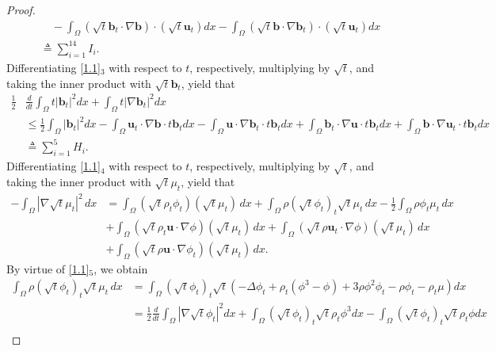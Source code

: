 \documentclass[11pt]{article}
\numberwithin{equation}{section}
\begin{document}
\begin{proof}
\begin{equation}
\begin{split}
&\quad-\int_\Omega\left(\sqrt t \mathbf{b}_t\cdot\nabla \mathbf{b} \right)\cdot \left(\sqrt t \mathbf{u}_t \right)dx
-\int_\Omega\left(\sqrt t \mathbf{b}\cdot\nabla \mathbf{b}_t\right)\cdot \left(\sqrt t \mathbf{u}_t\right)dx
\\&\triangleq\sum_{i=1}^{14} I_i .
\end{split}
\end{equation}
Differentiating \eqref{1.1}$_3$ with respect to $t$, respectively, multiplying by $\sqrt t$, and taking the inner product with $\sqrt t \mathbf{b}_t$, yield that
\begin{equation}
\begin{split}\label{eq-43}
\frac{1}{2}&\frac{d}{dt}\int_\Omega t|\mathbf{b}_t|^{2}dx+\int_\Omega t|\nabla\mathbf{b}_t|^{2}dx\\
&\leq\frac{1}{2}\int_\Omega|\mathbf{b}_t|^{2}dx-\int_\Omega \mathbf{u}_t \cdot\nabla \mathbf{b}\cdot t \mathbf{b}_tdx-\int_\Omega \mathbf{u} \cdot\nabla \mathbf{b}_t\cdot t \mathbf{b}_tdx+\int_\Omega \mathbf{b}_t \cdot\nabla \mathbf{u}\cdot t \mathbf{b}_tdx+\int_\Omega \mathbf{b} \cdot\nabla \mathbf{u}_t\cdot t \mathbf{b}_tdx
\\&\triangleq\sum_{i=1}^{5} H_i .
\end{split}
\end{equation}
Differentiating \eqref{1.1}$_4$ with respect to $t$, respectively, multiplying by $\sqrt t$, and taking the inner product with $\sqrt t \mu_t$, yield that
\begin{align*}-\int_{\Omega} |\nabla \sqrt{t} \mu_t|^2 \, dx&=\int_{\Omega} (\sqrt{t} \rho_t \phi_t)(\sqrt{t} \mu_t) \, dx + \int_{\Omega} \rho (\sqrt{t} \phi_t)_t \sqrt{t} \mu_t \, dx - \frac{1}{2} \int_{\Omega} \rho \phi_t \mu_t \, dx \\
&+ \int_{\Omega} (\sqrt{t} \rho_t \mathbf{u}\cdot \nabla\phi)(\sqrt{t} \mu_t) \, dx+ \int_{\Omega} (\sqrt{t} \rho \mathbf{u}_t\cdot \nabla\phi)(\sqrt{t} \mu_t) \, dx \\
&+ \int_{\Omega} (\sqrt{t} \rho \mathbf{u}\cdot \nabla\phi_t)(\sqrt{t} \mu_t) \, dx.
\end{align*}
By  virtue of \eqref{1.1}$_5$,  we obtain
\begin{align*}
\int_{\Omega} \rho (\sqrt{t} \phi_t)_t \sqrt{t} \mu_t \, dx &= \int_{\Omega} (\sqrt{t} \phi_t)_t \sqrt{t} \left(-\Delta \phi_t + \rho_t (\phi^3 - \phi) + 3\rho \phi^2 \phi_t - \rho \phi_t - \rho_t \mu \right) dx \\
&= \frac{1}{2} \frac{d}{dt} \int_{\Omega} |\nabla \sqrt{t} \phi_t|^2 dx + \int_{\Omega} (\sqrt{t} \phi_t)_t \sqrt{t} \rho_t \phi^3 dx - \int_{\Omega} (\sqrt{t} \phi_t)_t \sqrt{t} \rho_t \phi dx \\

\end{align*}
\end{proof}
\end{document}
